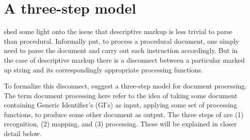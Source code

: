 \documentclass{scrreprt}
\begin{document}













\section{A three-step model}
\label{sec:three-step-model}
\citet{goldfarb} shed some light onto the issue that descriptive markup is less trivial to parse than procedural. Informally put, to process a procedural document, one simply need to parse the document and carry out each instruction accordingly. But in the case of descriptive markup there is a disconnect between a particular marked up string and its correspondingly appropriate processing functions.

To formalize this disconnect, \citet{goldfarb} suggest a three-step model for document processing. The term document processing here refer to the idea of taking some document containing Generic Identifier's (GI's) as input, applying some set of processing functions, to produce some other document as output. The three steps of \citet{goldfarb} are (1) recognition, (2) mapping, and (3) processing. These will be explained in closer detail below.
\end{document}
